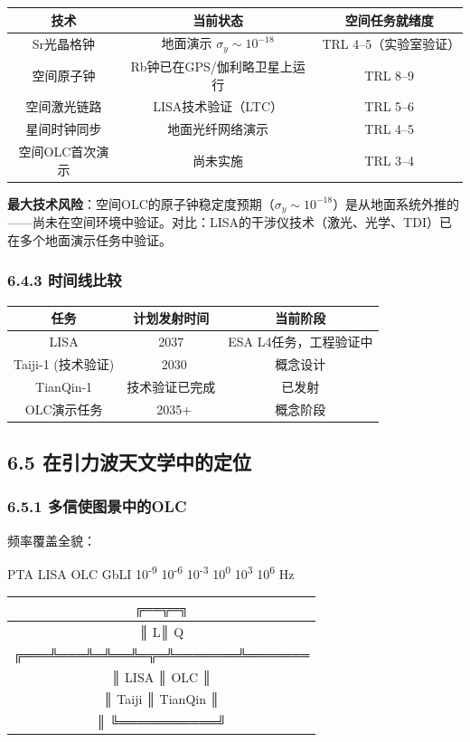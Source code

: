 \documentclass[12pt,a4paper]{article}
\begin{document}
\begin{tabular}{|c|c|c|}
\hline
技术 & 当前状态 & 空间任务就绪度 \\
\hline
Sr光晶格钟 & 地面演示 $\sigma_y \sim 10^{-18}$ & TRL 4–5（实验室验证） \\
空间原子钟 & Rb钟已在GPS/伽利略卫星上运行 & TRL 8–9 \\
空间激光链路 & LISA技术验证（LTC） & TRL 5–6 \\
星间时钟同步 & 地面光纤网络演示 & TRL 4–5 \\
空间OLC首次演示 & 尚未实施 & TRL 3–4 \\
\hline
\end{tabular}


\textbf{最大技术风险}：空间OLC的原子钟稳定度预期（$\sigma_y \sim 10^{-18}$）是从地面系统外推的——尚未在空间环境中验证。对比：LISA的干涉仪技术（激光、光学、TDI）已在多个地面演示任务中验证。

\subsubsection{6.4.3 时间线比较}


\begin{tabular}{|c|c|c|}
\hline
任务 & 计划发射时间 & 当前阶段 \\
\hline
LISA & 2037 & ESA L4任务，工程验证中 \\
Taiji-1 (技术验证) & ~2030 & 概念设计 \\
TianQin-1 & 技术验证已完成 & 已发射 \\
OLC演示任务 & ~2035+ & 概念阶段 \\
\hline
\end{tabular}


\subsection{6.5 在引力波天文学中的定位}


\subsubsection{6.5.1 多信使图景中的OLC}


频率覆盖全貌：

PTA      LISA              OLC          GbLI
10\textsuperscript{-9}    10\textsuperscript{-6}    10\textsuperscript{-3}     10\textsuperscript{0}      10\textsuperscript{3}     10\textsuperscript{6} Hz
\begin{tabular}{|c|}
\hline
╔══╦═╗ \\
\hline
║ L║ Q \\
╔═══╩═══╩═╩══╩═╦═╩═══════╩═══════ \\
║   LISA      ║ OLC       ║ \\
║   Taiji     ║ TianQin   ║ \\
║             ╚═══════════╝ \\
\hline
\end{tabular}
\end{document}
